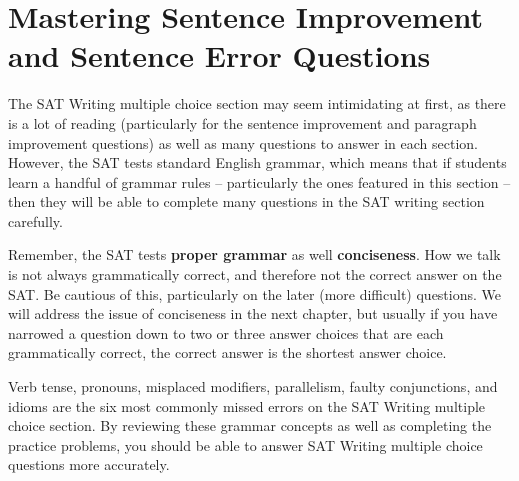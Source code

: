 \section{Mastering Sentence Improvement and Sentence Error Questions}

\begin{spacing}{1.5}
The SAT Writing multiple choice section may seem intimidating at first, as there is a lot of reading (particularly for the sentence improvement and paragraph improvement questions) as well as many questions to answer in each section. However, the SAT tests standard English grammar, which means that if students learn a handful of grammar rules -- particularly the ones featured in this section -- then they will be able to complete many questions in the SAT writing section carefully.

\bigskip
Remember, the SAT tests \textbf{proper grammar} as well \textbf{conciseness}. How we talk is not always grammatically correct, and therefore not the correct answer on the SAT. Be cautious of this, particularly on the later (more difficult) questions. We will address the issue of conciseness in the next chapter, but usually if you have narrowed a question down to two or three answer choices that are each grammatically correct, the correct answer is the shortest answer choice.

\bigskip
Verb tense, pronouns, misplaced modifiers, parallelism, faulty conjunctions, and idioms are the six most commonly missed errors on the SAT Writing multiple choice section. By reviewing these grammar concepts as well as completing the practice problems, you should be able to answer SAT Writing multiple choice questions more accurately.
\end{spacing}